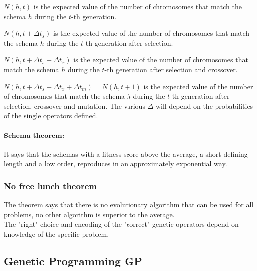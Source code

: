 \begin{definition}
	$N(h,t)$ is the expected value of the number of chromosomes that match the schema $h$ during the $t$-th generation.\\
\end{definition}

\begin{definition}
	$N(h, t + \Delta t_s)$ is the expected value of the number of chromosomes that match the schema $h$ during the $t$-th generation after selection.\\
\end{definition}

\begin{definition}
	$N(h, t + \Delta t_s + \Delta t_x)$ is the expected value of the number of chromosomes that match the schema $h$ during the $t$-th generation after selection and crossover.\\
\end{definition}

\begin{definition}
	$N(h, t + \Delta t_s + \Delta t_x + \Delta t_m) = N(h, t+1)$ is the expected value of the number of chromosomes that match the schema $h$ during the $t$-th generation after selection, crossover and mutation. The various $\Delta$ will depend on the probabilities of the single operators defined.\\
\end{definition}

\paragraph{Schema theorem:} It says that the schemas with a fitness score above the average, a short defining length and a low order, reproduces in an approximately exponential way.\\

\subsubsection{No free lunch theorem}
The theorem says that there is no evolutionary algorithm that can be used for all problems, no other algorithm is superior to the average.\\
The "right" choice and encoding of the "correct" genetic operators depend on knowledge of the specific problem. \\

\subsection{Genetic Programming GP}

